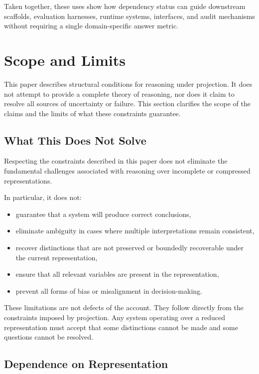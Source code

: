 \documentclass[11pt]{article}
\begin{document}
Taken together, these uses show how dependency status can guide downstream scaffolds, evaluation harnesses, runtime systems, interfaces, and audit mechanisms without requiring a single domain-specific answer metric.

\section{Scope and Limits}

This paper describes structural conditions for reasoning under projection. It does not attempt to provide a complete theory of reasoning, nor does it claim to resolve all sources of uncertainty or failure. This section clarifies the scope of the claims and the limits of what these constraints guarantee.

\subsection{What This Does Not Solve}

Respecting the constraints described in this paper does not eliminate the fundamental challenges associated with reasoning over incomplete or compressed representations.

In particular, it does not:

\begin{itemize}[leftmargin=1.5em]
    \item guarantee that a system will produce correct conclusions,
    \item eliminate ambiguity in cases where multiple interpretations remain consistent,
    \item recover distinctions that are not preserved or boundedly recoverable under the current representation,
    \item ensure that all relevant variables are present in the representation,
    \item prevent all forms of bias or misalignment in decision-making.
\end{itemize}

These limitations are not defects of the account. They follow directly from the constraints imposed by projection. Any system operating over a reduced representation must accept that some distinctions cannot be made and some questions cannot be resolved.

\subsection{Dependence on Representation}
\end{document}
